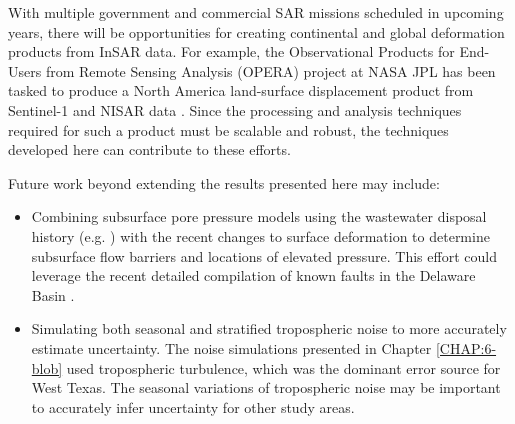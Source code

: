 With multiple government and commercial SAR missions scheduled in upcoming years, there will be opportunities for creating continental and global deformation products from InSAR data.
For example, the Observational Products for End-Users from Remote Sensing Analysis (OPERA) project at NASA JPL has been tasked to produce a North America land-surface displacement product from Sentinel-1 and NISAR data
\citep{Bekaert2021IntroducingOperaProject}.
Since the processing and analysis techniques required for such a product must be scalable and robust, the techniques developed here can contribute to these efforts.

Future work beyond extending the results presented here may include:

\begin{itemize}



\item Combining subsurface pore pressure models using the wastewater disposal history (e.g. \cite{Ge2022RecentWaterDisposal}) with the recent changes to surface deformation to determine subsurface flow barriers and locations of elevated pressure. This effort could leverage the recent detailed compilation of known faults in the Delaware Basin \citep{Horne2021BasementRootedFaults}.



\item Simulating both seasonal and stratified tropospheric noise to more accurately estimate uncertainty. The noise simulations presented in Chapter \ref{CHAP:6-blob} used tropospheric turbulence, which was the dominant error source for West Texas. The seasonal variations of tropospheric noise may be important to accurately infer uncertainty for other study areas.


\end{itemize}
